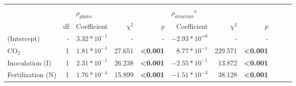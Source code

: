 \begin{landscape}
\begin{table}
{\begin{tabular}{p{3cm}p{0.5cm}p{1.75cm}p{1.5cm}p{1.5cm}p{1.75cm}p{1.5cm}p{1.5cm}p{1.75cm}p{1.5cm}p{1.5cm}}
            &&&&&&&&&&
            \\

            &&  \multicolumn{3}{l}{$\rho_\mathrm{photo}$} 
            &   \multicolumn{3}{l}{$\rho_\mathrm{structure}{}^a$} 
            &&& \\
            \hline
            & \multicolumn{1}{r}{df}
            & \multicolumn{1}{r}{Coefficient}   & \multicolumn{1}{r}{$\chi^{2}$}    & \multicolumn{1}{r}{\textit{p}} 
            & \multicolumn{1}{r}{Coefficient}   & \multicolumn{1}{r}{$\chi^{2}$}    & \multicolumn{1}{r}{\textit{p}} 
            \\
            \hline

            (Intercept) & \multicolumn{1}{r}{-}
            & \multicolumn{1}{r}{$3.32*10^{-1}$}      & \multicolumn{1}{r}{-}             & \multicolumn{1}{r}{-}
            & \multicolumn{1}{r}{$-2.93*10^{+0}$}     & \multicolumn{1}{r}{-}             & \multicolumn{1}{r}{-}
            & \multicolumn{1}{r}{}              & \multicolumn{1}{r}{}              & \multicolumn{1}{r}{}
            \\

            CO$_2$ & \multicolumn{1}{r}{1}
            & \multicolumn{1}{r}{$1.81*10^{-1}$}      & \multicolumn{1}{r}{27.651}        & \multicolumn{1}{r}{\textbf{<0.001}}
            & \multicolumn{1}{r}{$8.77*10^{-1}$}      & \multicolumn{1}{r}{229.571}       & \multicolumn{1}{r}{\textbf{<0.001}}
            & \multicolumn{1}{r}{}              & \multicolumn{1}{r}{}              & \multicolumn{1}{r}{} 
            \\

            Inoculation (I) & \multicolumn{1}{r}{1}
            & \multicolumn{1}{r}{$2.31*10^{-1}$}      & \multicolumn{1}{r}{26.238}        & \multicolumn{1}{r}{\textbf{<0.001}}
            & \multicolumn{1}{r}{$-2.55*10^{-1}$}     & \multicolumn{1}{r}{13.872}        & \multicolumn{1}{r}{\textbf{<0.001}}
            & \multicolumn{1}{r}{}              & \multicolumn{1}{r}{}              & \multicolumn{1}{r}{} 
            \\

            Fertilization (N) & \multicolumn{1}{r}{1}
            & \multicolumn{1}{r}{$1.76*10^{-4}$}      & \multicolumn{1}{r}{15.899}        & \multicolumn{1}{r}{\textbf{<0.001}}
            & \multicolumn{1}{r}{$-1.51*10^{-3}$}     & \multicolumn{1}{r}{38.128}        & \multicolumn{1}{r}{\textbf{<0.001}}
            & \multicolumn{1}{r}{}              & \multicolumn{1}{r}{}              & \multicolumn{1}{r}{} 
            \\


\end{tabular}}
\end{table}
\end{landscape}
